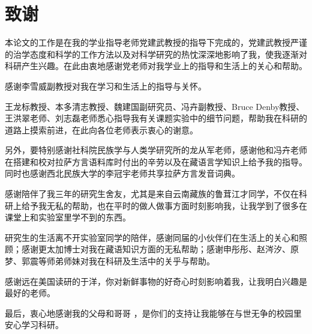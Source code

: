 
\chapter*{致\quad 谢}

\vspace*{1cm}
本论文的工作是在我的学业指导老师党建武教授的指导下完成的，党建武教授严谨的治学态度和科学的工作方法以及对科学研究的热忱深深地影响了我，使我逐渐对科研产生兴趣。在此由衷地感谢党老师对我学业上的指导和生活上的关心和帮助。

感谢李雪威副教授对我在学习和生活上的指导与关怀。

王龙标教授、本多清志教授、魏建国副研究员、冯卉副教授、Bruce Denby教授、王洪翠老师、刘志磊老师悉心指导我有关课题实验中的细节问题，帮助我在科研的道路上摸索前进，在此向各位老师表示衷心的谢意。

另外，要特别感谢社科院民族学与人类学研究所的龙从军老师，感谢他和冯卉老师在搭建和校对拉萨方言语料库时付出的辛劳以及在藏语言学知识上给予我的指导。同时也感谢西北民族大学的李冠宇老师共享拉萨方言发音词典。

感谢陪伴了我三年的研究生舍友，尤其是来自云南藏族的鲁茸江才同学，不仅在科研上给予我无私的帮助，也在平时的做人做事方面时刻影响我，让我学到了很多在课堂上和实验室里学不到的东西。

研究生的生活离不开实验室同学的陪伴，感谢同届的小伙伴们在生活上的关心和照顾；感谢更太加博士对我在藏语知识方面的无私帮助；感谢申彤彤、赵涔汐、原梦、郭震等师弟师妹对我在科研及生活中的关乎与帮助。

感谢远在美国读研的于洋，你对新鲜事物的好奇心时刻影响着我，让我明白兴趣是最好的老师。

最后，衷心地感谢我的父母和哥哥 ，是你们的支持让我能够在与世无争的校园里安心学习科研。
